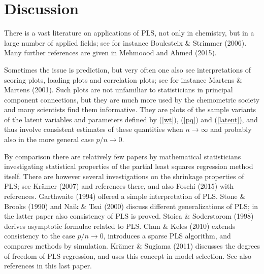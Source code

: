 \documentclass[a4paper, 11pt]{article}
\begin{document}



\section{Discussion}

There is a vast literature on applications of PLS, not only in chemistry, but in
a large number of applied fields; see for instance Boulesteix \& Strimmer
(2006). Many further references are given in \citet{mehmood2016diversity}
Mehmoood and Ahmed (2015).

Sometimes the issue is prediction, but very often one also see interpretations of scoring plots, loading plots and correlation plots; see for instance Martens \& Martens (2001). Such plots are not unfamiliar to statisticians in principal component connections, but they are much more used by the chemometric society and many scientists find them informative. They are plots of the sample variants of the latent variables and parameters defined by (\ref{wt}), (\ref{pq}) and (\ref{latent}), and thus involve consistent estimates of these quantities when $n\rightarrow\infty$ and probably also in the more general case $p/n\rightarrow 0$.

By comparison there are relatively few papers by mathematical statisticians investigating statistical properties of the partial least squares regression method itself. There are however several investigations on the shrinkage properties of PLS; see Kr\"{a}mer (2007) and references there, and also Foschi (2015) with references. Garthwaite (1994) offered a simple interpretation of PLS. Stone \& Brooks (1990) and Naik \& Tsai (2000)  discuss different generalizations of PLS; in the latter paper also consistency of PLS is proved. Stoica \& Soderstorom (1998) derives asymptotic formulae related to PLS. Chun \& Keles (2010) extends consistency to the case $p/n\rightarrow 0$, introduces a sparse PLS algorithm, and compares methods by simulation.  Kr\"{a}mer \& Sugiama (2011) discusses the degrees of freedom of PLS regression, and uses this concept in model selection. See also references in this last paper.
\end{document}
